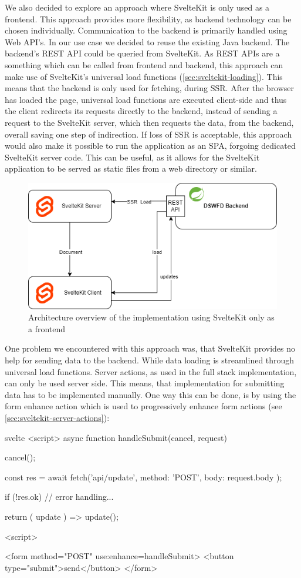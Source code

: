 We also decided to explore an approach where SvelteKit is only used as a frontend. This approach provides more flexibility, as backend technology can be chosen individually. Communication to the backend is primarily handled using Web API's. In our use case we decided to reuse the existing Java backend. The backend's REST API could be queried from SvelteKit. As REST APIs are a something which can be called from frontend and backend, this approach can make use of SvelteKit's universal load functions (\ref{sec:sveltekit-loading}). This means that the backend is only used for fetching, during SSR. After the browser has loaded the page, universal load functions are executed client-side and thus the client redirects its requests directly to the backend, instead of sending  a request to the SvelteKit server, which then requests the data, from the backend, overall saving one step of indirection. If loss of SSR is acceptable, this approach would also make it possible to run the application as an SPA, forgoing dedicated SvelteKit server code. This can be useful, as it allows for the SvelteKit application to be served as static files from a web directory or similar. 

\begin{figure}[ht]
    \centering
    \includegraphics[width=.6\linewidth]{assets/fe-only-client-takes-over}
    \caption{Architecture overview of the implementation using SvelteKit only as a frontend}
    \label{fig:dswfd-architecture-fe-only}
\end{figure}

One problem we encountered with this approach was, that SvelteKit provides no help for sending data to the backend. While data loading is streamlined through universal load functions. Server actions, as used in the full stack implementation, can only be used server side. This means, that implementation for submitting data has to be implemented manually. One way this can be done, is by using the form enhance action which is used to progressively enhance form actions (see \ref{sec:sveltekit-server-actions}):

\begin{myminted}{svelte}{}
<script>
async function handleSubmit({cancel, request}) {
    cancel();

    const res = await fetch('api/update', {
        method: 'POST',
        body: request.body
    });

    if (!res.ok) {
        // error handling...
    }

    return ({ update }) => {
        update();
    }
}
<script>

<form method="POST" use:enhance={handleSubmit}>
    <button type="submit">send</button>
</form>
\end{myminted}

